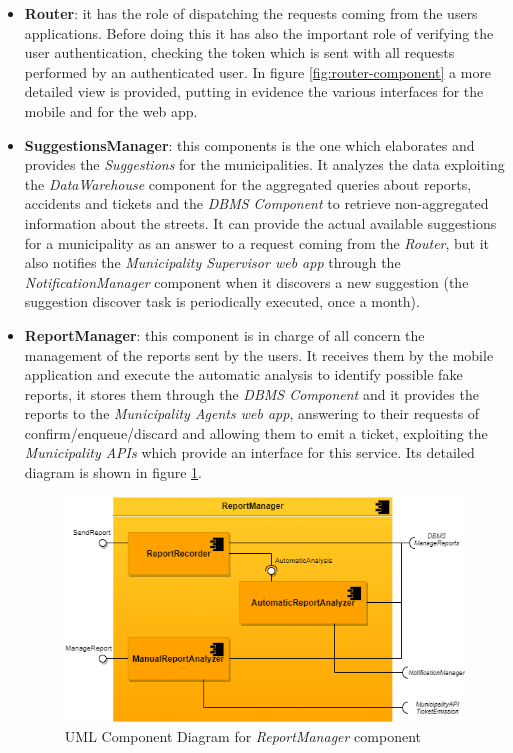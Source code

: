 \documentclass[a4paper]{report}
\begin{document}
\begin{itemize}
\item \textbf{Router}: it has the role of dispatching the requests coming from the users applications. Before doing this it has also the important role of verifying the user authentication, checking the token which is sent with all requests performed by an authenticated user. In figure \ref{fig:router-component} a more detailed view is provided, putting in evidence the various interfaces for the mobile and for the web app.

\item \textbf{SuggestionsManager}: this components is the one which elaborates and provides the \textit{Suggestions} for the municipalities. It analyzes the data exploiting the \textit{DataWarehouse} component for the aggregated queries about reports, accidents and tickets and the \textit{DBMS Component} to retrieve non-aggregated information about the streets. It can provide the actual available suggestions for a municipality as an answer to a request coming from the \textit{Router}, but it also notifies the \textit{Municipality Supervisor web app} through the \textit{NotificationManager} component when it discovers a new suggestion (the suggestion discover task is periodically executed, once a month).
\item \textbf{ReportManager}: this component is in charge of all concern the management of the reports sent by the users. It receives them by the mobile application and execute the automatic analysis to identify possible fake reports, it stores them through the \textit{DBMS Component} and it provides the reports to the \textit{Municipality Agents web app}, answering to their requests of confirm/enqueue/discard and allowing them to emit a ticket, exploiting the \textit{Municipality APIs} which provide an interface for this service. Its detailed diagram is shown in figure \ref{fig:reportmgr-component}.

\begin{figure}[htp]
\includegraphics[width=\textwidth]{ReportManager}
\caption{UML Component Diagram for \textit{ReportManager} component}
\label{fig:reportmgr-component}
\end{figure}


\end{itemize}
\end{document}
